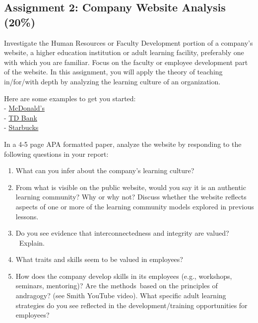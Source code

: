 \documentclass[
]{book}
\providecommand{\tightlist}{%
  \setlength{\itemsep}{0pt}\setlength{\parskip}{0pt}}
\begin{document}
\begin{assessment}
\hypertarget{assignment-2-company-website-analysis-20}{%
\subsection*{Assignment 2: Company Website Analysis
(20\%)}\label{assignment-2-company-website-analysis-20}}

Investigate the Human Resources or Faculty Development portion of a
company's website, a higher education institution or adult learning
facility, preferably one with which you are familiar. Focus on the
faculty or employee development part of the website. In this assignment,
you will apply the theory of teaching in/for/with depth by analyzing the
learning culture of an organization.

Here are some examples to get you started:\\
-
\href{https://www.mcdonalds.com/ca/en-ca/careers/training-and-benefits.html}{McDonald's}\\
-
\href{https://jobs.td.com/en-CA/why-choose-us/training-development/}{TD
Bank}\\
-
\href{https://www.starbucks.com.hk/about-us/become-a-partner/learning-and-development}{Starbucks}

In a 4-5 page APA formatted paper, analyze the website by responding to
the following questions in your report:

\begin{enumerate}
\def\labelenumi{\arabic{enumi}.}
\tightlist
\item
  What can you infer about the company's learning culture?
\item
  From what is visible on the public website, would you say it is an
  authentic learning community? Why or why not? Discuss whether the
  website reflects aspects of one or more of the learning community
  models explored in previous lessons.
\item
  Do you see evidence that interconnectedness and integrity are valued?
  ~Explain.
\item
  What traits and skills seem to be valued in employees?
\item
  How does the company develop skills in its employees (e.g., workshops,
  seminars, mentoring)? Are the methods~based on the principles of
  andragogy? (see Smith YouTube video). What specific adult learning
  strategies do you see reflected in the development/training
  opportunities for employees?
\end{enumerate}


\end{assessment}
\end{document}

